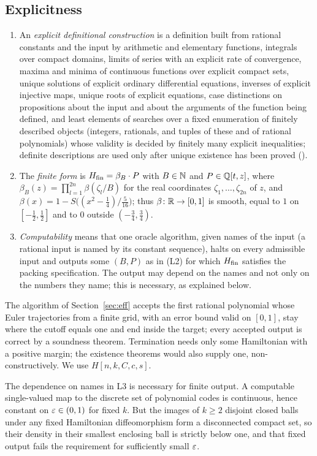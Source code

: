 \subsection{Explicitness}\label{p2:sec-machine-eff}

\begin{definition}\label{def:intro-levels}
\begin{enumerate}[label=(L\arabic*)]
\item An \emph{explicit definitional construction} is a definition built from rational constants and the
 input by arithmetic and elementary functions, integrals over compact domains, limits of series with an
 explicit rate of convergence, maxima and minima of continuous functions over explicit compact sets,
 unique solutions of explicit ordinary differential equations, inverses of explicit injective maps,
 unique roots of explicit equations, case distinctions on propositions about the input and about the arguments of
 the function being defined, and least
 elements of searches over a fixed enumeration of finitely described objects (integers, rationals, and
 tuples of these and of rational polynomials) whose validity is decided by finitely many explicit
 inequalities; definite descriptions are used only after unique existence has been proved
 ().
\item The \emph{finite form} is $H_{\mathrm{fin}}=\beta_B\cdot P$ with $B\in\mathbb{N}$ and $P\in\mathbb{Q}[t,z]$, where
 $\beta_B(z)=\prod_{l=1}^{2n}\beta(\zeta_l/B)$ for the real coordinates $\zeta_1,\dots,\zeta_{2n}$ of $z$,
 and $\beta(x)=1-S\big((x^2-\frac14)/\frac5{16}\big)$; thus $\beta\colon\mathbb{R}\to[0,1]$ is smooth, equal to $1$ on
 $[-\frac12,\frac12]$ and to $0$ outside $(-\frac34,\frac34)$.
\item \emph{Computability} means that one oracle algorithm, given names of the input (a rational input is named by
 its constant sequence), halts on every admissible input and outputs some $(B,P)$ as in (L2) for which $H_{\mathrm{fin}}$
 satisfies the packing specification. The output may depend on the names and not only on the numbers they name;
 this is necessary, as explained below.
\end{enumerate}
\end{definition}

The algorithm of Section~\ref{sec:eff} accepts the first rational polynomial whose Euler trajectories from a finite grid,
with an error bound valid on $[0,1]$, stay where the cutoff equals one and end inside the target; every accepted output
is correct by a soundness theorem. Termination needs only some Hamiltonian with a positive margin; the existence
theorems would also supply one, non-constructively. We use $H[n,k,C,c,s]$.

The dependence on names in L3 is necessary for finite output. A computable single-valued map to the discrete set
of polynomial codes is continuous, hence constant on $\varepsilon\in(0,1)$ for fixed $k$. But the images of $k\ge2$
disjoint closed balls under any fixed Hamiltonian diffeomorphism form a disconnected compact set, so their density in
their smallest enclosing ball is strictly below one, and that fixed output fails the requirement for sufficiently
small $\varepsilon$.

